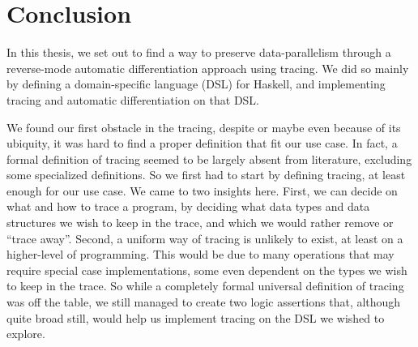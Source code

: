 \section{Conclusion}
    In this thesis, we set out to find a way to preserve data-parallelism through a reverse-mode automatic differentiation approach using tracing.
    We did so mainly by defining a domain-specific language (DSL) for Haskell, and implementing tracing and automatic differentiation on that DSL.

    We found our first obstacle in the tracing, despite or maybe even because of its ubiquity, it was hard to find a proper definition that fit our use case.
    In fact, a formal definition of tracing seemed to be largely absent from literature, excluding some specialized definitions.
    So we first had to start by defining tracing, at least enough for our use case.
    We came to two insights here.
    First, we can decide on what and how to trace a program, by deciding what data types and data structures we wish to keep in the trace, and which we would rather remove or ``trace away''.
    Second, a uniform way of tracing is unlikely to exist, at least on a higher-level of programming.
    This would be due to many operations that may require special case implementations, some even dependent on the types we wish to keep in the trace.
    So while a completely formal universal definition of tracing was off the table, we still managed to create two logic assertions that, although quite broad still, would help us implement tracing on the DSL we wished to explore.
    

